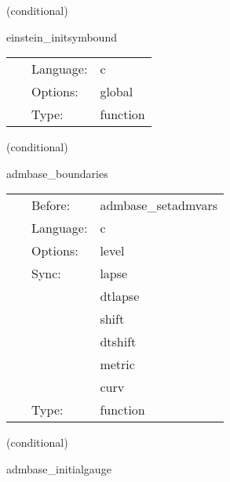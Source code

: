 \documentclass{article}
\begin{document}
\vspace{5mm}

   (conditional) 

\hspace{5mm} einstein\_initsymbound 

\hspace{5mm}{\it set up gf symmetries } 


\hspace{5mm}

 \begin{tabular*}{160mm}{cll} 
~ & Language:  & c \\ 
~ & Options:  & global \\ 
~ & Type:  & function \\ 
\end{tabular*} 


\vspace{5mm}

   (conditional) 

\hspace{5mm} admbase\_boundaries 

\hspace{5mm}{\it select admbase boundary conditions - may be required for mesh refinement } 


\hspace{5mm}

 \begin{tabular*}{160mm}{cll} 
~ & Before:  & admbase\_setadmvars \\ 
~ & Language:  & c \\ 
~ & Options:  & level \\ 
~ & Sync:  & lapse \\ 
~& ~ &dtlapse\\ 
~& ~ &shift\\ 
~& ~ &dtshift\\ 
~& ~ &metric\\ 
~& ~ &curv\\ 
~ & Type:  & function \\ 
\end{tabular*} 


\vspace{5mm}

   (conditional) 

\hspace{5mm} admbase\_initialgauge 

\hspace{5mm}{\it schedule group for the adm initial gauge condition } 
\end{document}
